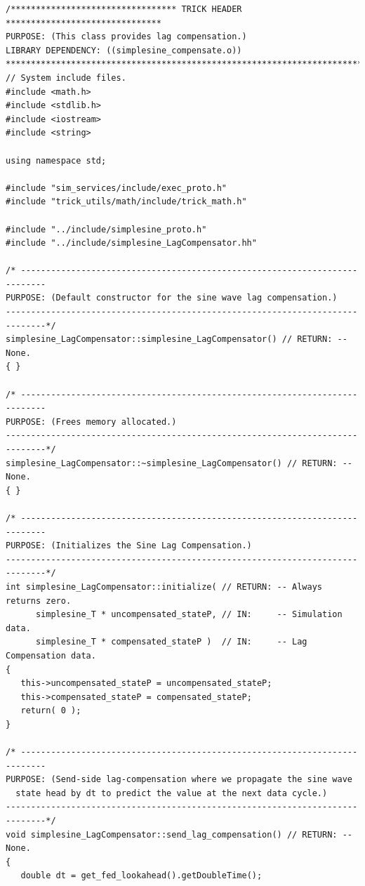 \begin{lstlisting}[caption={The {\tt simplesine\_LagCompensation} class methods},label={list:simplesine-LagCompensation-methods}]
/********************************* TRICK HEADER *******************************
PURPOSE: (This class provides lag compensation.)
LIBRARY DEPENDENCY: ((simplesine_compensate.o))
*******************************************************************************/
// System include files.
#include <math.h>
#include <stdlib.h>
#include <iostream>
#include <string>

using namespace std;

#include "sim_services/include/exec_proto.h"
#include "trick_utils/math/include/trick_math.h"

#include "../include/simplesine_proto.h"
#include "../include/simplesine_LagCompensator.hh"

/* ---------------------------------------------------------------------------
PURPOSE: (Default constructor for the sine wave lag compensation.)
------------------------------------------------------------------------------*/
simplesine_LagCompensator::simplesine_LagCompensator() // RETURN: -- None.
{ }

/* ---------------------------------------------------------------------------
PURPOSE: (Frees memory allocated.)
------------------------------------------------------------------------------*/
simplesine_LagCompensator::~simplesine_LagCompensator() // RETURN: -- None.
{ }

/* ---------------------------------------------------------------------------
PURPOSE: (Initializes the Sine Lag Compensation.)
------------------------------------------------------------------------------*/
int simplesine_LagCompensator::initialize( // RETURN: -- Always returns zero.
      simplesine_T * uncompensated_stateP, // IN:     -- Simulation data.
      simplesine_T * compensated_stateP )  // IN:     -- Lag Compensation data.
{
   this->uncompensated_stateP = uncompensated_stateP;
   this->compensated_stateP = compensated_stateP;
   return( 0 );
}

/* ---------------------------------------------------------------------------
PURPOSE: (Send-side lag-compensation where we propagate the sine wave
  state head by dt to predict the value at the next data cycle.)
------------------------------------------------------------------------------*/
void simplesine_LagCompensator::send_lag_compensation() // RETURN: -- None.
{
   double dt = get_fed_lookahead().getDoubleTime();


\end{lstlisting}
